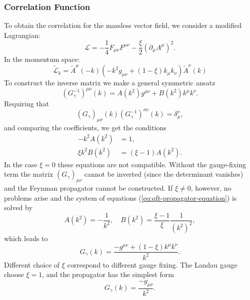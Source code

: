 \subsubsection{Correlation Function}
To obtain the correlation for the massless vector field, we consider a modified Lagrangian:
\begin{equation}
	\mathcal L = -\frac{1}{4}F_{\mu\nu}F^{\mu\nu}-\frac{\xi}{2}(\partial_\mu A^\mu)^2.
\end{equation}
In the momentum space:
\begin{equation}
	\tilde{\mathcal L}_k = \tilde{A}^\mu(-k)\left(-k^2 g_{\mu\nu}+(1-\xi)k_\mu k_\nu\right) \tilde{A}^\nu(k)
\end{equation}
To construct the inverse matrix we make a general symmetric ansatz
\begin{equation}
	(G_\gamma^{-1})^{\mu\nu}(k)=A\left(k^{2}\right) g^{\mu\nu}+B\left(k^{2}\right) k^{\mu} k^{\nu}.
\end{equation}
Requiring that
\begin{equation}
	(G_\gamma)_{\mu\sigma}(k)(G_\gamma^{-1})^{\sigma\nu}(k) = \delta_\mu^\nu,
\end{equation}
and comparing the coefficients, we get the conditions
\begin{equation}\label{eq:qft-propagator-equation}
\begin{aligned}
	-k^{2} A\left(k^{2}\right) &=1, \\
	\xi k^{2} B\left(k^{2}\right) &=(\xi-1) A\left(k^{2}\right).
\end{aligned}
\end{equation}
In the case $\xi=0$ these equations are not compatible. Without the gauge-fixing term the matrix $(G_\gamma)_{\mu \nu}$ cannot be inverted (since the determinant vanishes) and the Feynman propagator cannot be constructed. If $\xi \neq 0$, however, no problems arise and the system of equations (\ref{eq:qft-propagator-equation}) is solved by
\begin{equation}
	A\left(k^{2}\right)=-\frac{1}{k^{2}}, \quad B\left(k^{2}\right)=\frac{\xi-1}{\xi} \frac{1}{\left(k^{2}\right)^{2}},
\end{equation}
which leads to
\begin{equation}
	G_\gamma(k) = \frac{-g^{\mu\nu}+(1-\xi)k^\mu k^\nu}{k^2}.
\end{equation}
Different choice of $\xi$ correspond to different gauge fixing.
The Landau gauge choose $\xi=1$, and the propagator has the simplest form
\begin{equation}
	G_\gamma(k) = \frac{-g_{\mu\nu}}{k^2}.
\end{equation}



